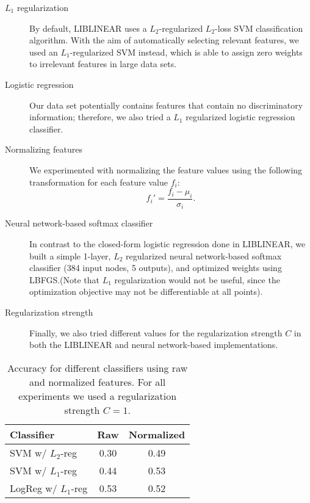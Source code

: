 \documentclass[twocolumn, 11pt]{article}
\begin{document}
\begin{description}

  \item[$L_1$ regularization] By default, LIBLINEAR uses a $L_2$-regularized
  $L_2$-loss SVM classification algorithm.  With the aim of automatically
  selecting relevant features, we used an $L_1$-regularized SVM instead, which
  is able to assign zero weights to irrelevant features in large data sets.

  \item[Logistic regression] Our data set potentially contains features that
  contain no discriminatory information; therefore, we also tried a $L_1$
  regularized logistic regression classifier.

  \item[Normalizing features] We experimented with normalizing the feature
  values using the following transformation for each feature value $f_i$:
  \[f_i' = \frac{f_i - \mu_i}{\sigma_i}.\]

  \item[Neural network-based softmax classifier] In contrast to the closed-form
  logistic regression done in LIBLINEAR, we built a simple 1-layer, $L_2$
  regularized neural network-based softmax classifier (384 input nodes, 5
  outputs), and optimized weights using LBFGS.\@ (Note that $L_1$ regularization
  would not be useful, since the optimization objective may not be
  differentiable at all points).

  \item[Regularization strength] Finally, we also tried different values for
  the regularization strength $C$ in both the LIBLINEAR and neural
  network-based implementations.

\end{description}

\begin{table}[b]\centering
  \begin{tabular}{lcc}
    \toprule
    Classifier & Raw  & Normalized \\
    \midrule
    SVM w/ $L_2$-reg & 0.30 & 0.49 \\
    SVM w/ $L_1$-reg & 0.44 & 0.53 \\
    LogReg w/ $L_1$-reg & 0.53 & 0.52  \\
    \bottomrule
  \end{tabular}
  \caption{Accuracy for different classifiers using raw and normalized
  features. For all experiments we used a regularization strength
$C=1$.}\label{tab:results}
\end{table}
\end{document}
